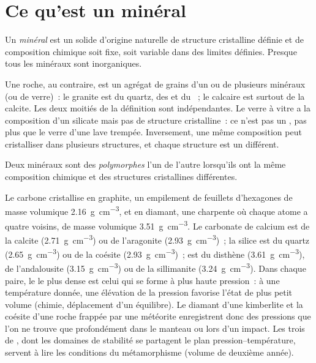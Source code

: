 \section{Ce qu'est un minéral}

\begin{definition}[Minéral]\label{def:b1:rock-forming-minerals:mineral}
Un \emph{minéral} est un solide d'origine naturelle de structure cristalline définie
et de composition chimique soit fixe, soit variable dans des limites définies.
Presque tous les minéraux sont inorganiques.
\end{definition}

Une roche, au contraire, est un agrégat de grains d'un ou de plusieurs minéraux
(ou de verre)~: le granite est du quartz, des  et du ~; le calcaire
est surtout de la calcite. Les deux moitiés de la définition sont indépendantes.
Le verre à vitre a la composition d'un silicate mais pas de structure
cristalline~: ce n'est pas un , pas plus que le verre d'une lave trempée.
Inversement, une même composition peut cristalliser dans plusieurs structures, et
chaque structure est un  différent.

\begin{definition}[Polymorphe]\label{def:b1:rock-forming-minerals:polymorph}
Deux minéraux sont des \emph{polymorphes} l'un de l'autre lorsqu'ils ont la même
composition chimique et des structures cristallines différentes.
\end{definition}

Le carbone cristallise en graphite, un empilement de feuillets d'hexagones de
masse volumique \qty{2.16}{g.cm^{-3}}, et en diamant, une charpente où chaque
atome a quatre voisins, de masse volumique \qty{3.51}{g.cm^{-3}}. Le carbonate de
calcium est de la calcite (\qty{2.71}{g.cm^{-3}}) ou de l'aragonite
(\qty{2.93}{g.cm^{-3}})~; la silice est du quartz (\qty{2.65}{g.cm^{-3}}) ou de la
coésite (\qty{2.93}{g.cm^{-3}})~;  est du disthène
(\qty{3.61}{g.cm^{-3}}), de l'andalousite (\qty{3.15}{g.cm^{-3}}) ou de la
sillimanite (\qty{3.24}{g.cm^{-3}}).
Dans chaque paire, le  le plus dense est celui qui se forme à plus
haute pression~: à une température donnée, une élévation de la pression favorise
l'état de plus petit volume (chimie, déplacement d'un équilibre). Le diamant
d'une kimberlite et la coésite d'une roche frappée par une météorite enregistrent
donc des pressions que l'on ne trouve que profondément dans le manteau ou lors
d'un impact. Les trois  de , dont les domaines de
stabilité se partagent le plan pression--température, servent à lire les
conditions du métamorphisme (volume de deuxième année).

